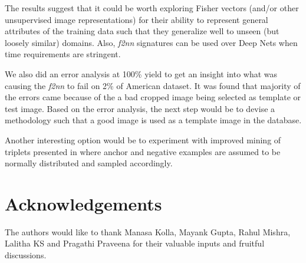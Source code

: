 \documentclass[10pt,twocolumn,letterpaper]{article}
\begin{document}
        The results suggest that it could be worth exploring Fisher vectors (and/or other unsupervised image representations) for their ability to represent general attributes of the training data such that they generalize well to unseen (but loosely similar) domains. Also, \emph{f2nn} signatures can be used over Deep Nets when time requirements are stringent. 
        
    We also did an error analysis at 100\% yield to get an insight into what was causing the \emph{f2nn} to fail on 2\% of American dataset. It was found that majority of the errors came because of the a bad cropped image being selected as template or test image. 
        Based on the error analysis, the next step would be to devise a methodology such that a good image is used as a template image in the database.
        
        Another interesting option would be to experiment with improved mining of triplets presented in \cite{kumar2017smart} where anchor and negative examples are assumed to be normally distributed and sampled accordingly.
\begin{comment}
\textbf(TODO:) This section is for making some general observations and explanations for the same about generalizability across domains. Unsupervised feature + Good loss function $>$ CNN + Softmax $>$ CNN + Triplet. This has to nicely written 
\end{comment}

\section*{Acknowledgements \label{sec:ack}}
    The authors would like to thank Manasa Kolla, Mayank Gupta, Rahul Mishra, Lalitha KS and Pragathi Praveena for their valuable inputs and fruitful discussions.



{\small


}
\end{document}
